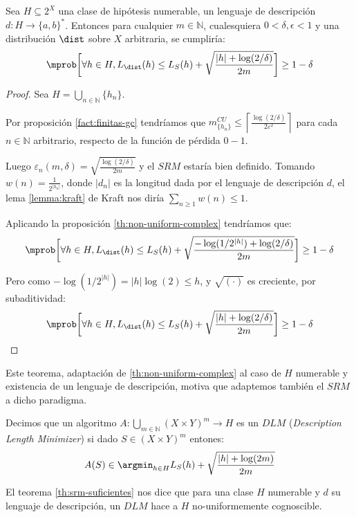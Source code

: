 \begin{fact}
 Sea $H \subseteq 2^X$ una clase de hipótesis numerable, un lenguaje de descripción $d:H \rightarrow \{a,b\}^{\ast}$. Entonces
 para cualquier $m\in \mathbb{N}$, cualesquiera $0 < \delta, \epsilon < 1$ y una distribución $\dist$ sobre $X$ arbitraria, 
 se cumpliría:
 \[
   \mprob\bigg[\forall h\in H, L_{\dist}(h) \le L_S(h) + \sqrt{\frac{|h| + \log(2/\delta)}{2m}} \bigg] \ge 1 - \delta
 \] 
 \label{fact:occam}
\end{fact}
\begin{proof}
 Sea $H = \bigcup_{n\in \mathbb{N}} \{h_n\}$. 
 
 Por proposición \ref{fact:finitas-gc} tendríamos que $m^{CU}_{\{h_n\}} \le \left\lceil \frac{\log(2/\delta)}{2\varepsilon^2} \right\rceil$
 para cada $n\in \mathbb{N}$ arbitrario, respecto de la función de pérdida $0-1$.
 
 Luego $\varepsilon_n(m,\delta) = \sqrt{\frac{\log(2/\delta)}{2m}}$ y el $SRM$ estaría bien definido. Tomando $w(n) = \frac{1}{2^{|h_n|}}$, donde
 $|d_n|$ es la longitud dada por el lenguaje de descripción $d$, el lema \ref{lemma:kraft} de Kraft nos diría 
 $\sum_{n \ge 1} w(n) \le 1$.
 
 Aplicando la proposición \ref{th:non-uniform-complex} tendríamos que:
 \[
   \mprob\bigg[\forall h\in H, L_{\dist}(h) \le L_S(h) + \sqrt{\frac{-\log(1/2^{|h|}) + \log(2/\delta)}{2m}} \bigg] \ge 1 - \delta
 \]
 
 Pero como $-\log(1/2^{|h|}) = |h|\log(2) \le h$, y $\sqrt{(\cdot)}$ es creciente, por subaditividad:
 \[
   \mprob\bigg[\forall h\in H, L_{\dist}(h) \le L_S(h) + \sqrt{\frac{|h| + \log(2/\delta)}{2m}} \bigg] \ge 1 - \delta
 \]
\end{proof}

Este teorema, adaptación de \ref{th:non-uniform-complex} al caso de $H$ numerable y existencia de un lenguaje de descripción,
motiva que adaptemos también el $SRM$ a dicho paradigma.

\begin{definition}
Decimos que un algoritmo $A: \underset{m\in \mathbb{N}}{\bigcup} (X\times Y)^m \rightarrow H$ es un $DLM$ 
(\textit{Description Length Minimizer}) si dado $S \in (X\times Y)^m$ entones:
\[
  A(S) \in \argmin_{h\in H} L_S(h) + \sqrt{\frac{|h| + \log(2m)}{2m}} 
\]
\end{definition}

El teorema \ref{th:srm-suficientes} nos dice que para una clase $H$ numerable y $d$ su lenguaje de descripción, un $DLM$
hace a $H$ no-uniformemente cognoscible.

